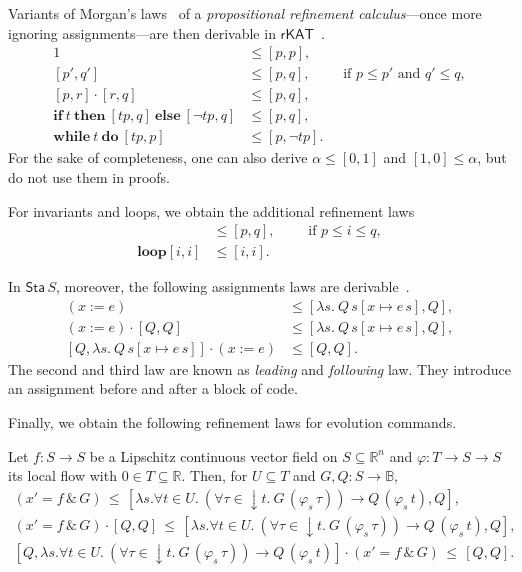 \documentclass[envcountsame,envcountsect]{llncs}
\newcommand{\IF}[3]{\mathbf{if}\ #1\ \mathbf{then}\ #2\ \mathbf{else}\ #3}
\newcommand{\WHILE}[2]{\mathbf{while}\ #1\ \mathbf{do}\ #2}
\newcommand{\rKAT}{\mathsf{rKAT}}
\newcommand{\flow}{\varphi}
\newcommand{\reals}{\mathbb{R}}
\newcommand{\bools}{\mathbb{B}}
\newcommand{\sta}{\mathsf{Sta}}
\begin{document}
Variants of Morgan's laws~\cite{Morgan94} of a \emph{propositional
  refinement calculus}---once more ignoring assignments---are then derivable in
$\rKAT$~\cite{ArmstrongGS16}.
\begin{align}
  1 &\le [p,p],\label{eq:r-skip}\tag{r-skip}\\
[p',q'] &\le [p,q],\qquad \text{ if } p\le p'\text{ and } q'\le q,\label{eq:r-cons}\tag{r-cons}\\
[p,r]\cdot [r,q] &\le [p,q],\label{eq:r-seq}\tag{r-seq}\\
\IF{t}{[tp,q]}{[\neg tp,q]} &\le [p,q],\label{eq:r-cond}\tag{r-cond}\\
 \WHILE{t}{[tp,p]} &\le [p,\neg tp]. \label{eq:r-while}\tag{r-while}
\end{align}
For the sake of completeness, one can also derive $\alpha \le [0,1]$ and $[1,0] \le \alpha$, but do not use them in proofs.

For invariants and loops, we obtain the additional refinement laws
\begin{align}
  [i,i] &\le [p,q],\qquad \text{ if } p\le i \le q,\label{eq:r-inv}\tag{r-inv}\\
\mathbf{loop} [i,i] &\le [i,i]. \label{eq:r-loop}\tag{r-loop}
\end{align}

In $\sta\, S$, moreover, the following assignments laws are
derivable~\cite{ArmstrongGS16}.
\begin{align}
 (x := e)  &\le  \left[\lambda s.\ Q\, s[x\mapsto e\, s],Q\right],\label{eq:r-assgn}\tag{r-assgn}\\
(x:= e) \cdot \left[Q,Q\right] &\le [\lambda s.\ Q\, s[x\mapsto e\, s],Q],\label{eq:r-assgn}\tag{r-assgnl}\\
\left[Q,\lambda s.\ Q\, s[x\mapsto e\, s]\right]\cdot (x:=e) &\le [Q,Q]. \label{eq:r-assgn}\tag{r-assgnf}
\end{align}
The second and third law are known as \emph{leading} and \emph{following}
law. They introduce an assignment before and after a block of code. 

Finally, we obtain the following refinement laws for evolution
commands.
\begin{lemma}\label{P:r-evl-lemma}
  Let $f:S\to S$ be a Lipschitz continuous vector field on
  $S\subseteq \reals^n$ and $\flow:T\to S\to S$ its local flow with
  $0\in T\subseteq \reals$. Then, for $U\subseteq T$ and
  $G,Q:S\to\bools$,
\begin{gather*}
(x' = f\, \&\, G)\, \le\, [\lambda s.\forall t\in U.\ (\forall
\tau\in {\downarrow}t.\ G\, (\flow_s\, \tau))\to Q\, (\flow_s\, t),Q],\label{eq:r-evl}\tag{r-evl}\\
(x' = f\, \&\, G) \cdot \left[Q,Q\right]\, \le\, [\lambda s. \forall t\in U.\ (\forall
\tau\in {\downarrow}t.\ G\, (\flow_s\, \tau))\to Q\, (\flow_s\, t),Q],\label{eq:r-evll}\tag{r-evll}\\
\left[Q,\lambda s. \forall t\in U.\ (\forall
\tau\in {\downarrow}t.\ G\, (\flow_s\, \tau))\to Q\, (\flow_s\,
t)\right]\cdot (x' = f\, \&\, G) \, \le \, [Q,Q].\label{eq:r-evlr}\tag{r-evlr}
\end{gather*}
\end{lemma}
\end{document}
